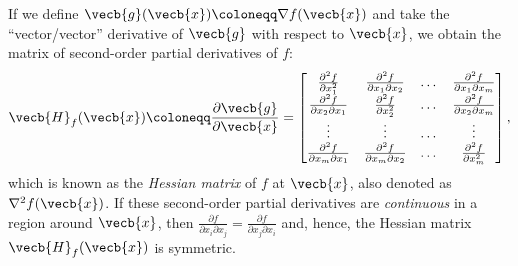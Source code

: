 If we define $\vecb{g}(\vecb{x}) \coloneqq \nabla f(\vecb{x})$ and take the ``vector/vector'' derivative of $\vecb{g}$ with respect to $\vecb{x}$, we obtain the matrix of second-order partial derivatives of $f$:
\begin{equation}
	\vecb{H}_f(\vecb{x}) \coloneqq \frac{\partial \vecb{g}}{\partial \vecb{x}} =
	\begin{bmatrix}
		\frac{\partial^2 f}{\partial x_1^2}            & \frac{\partial^2 f}{\partial x_1 \partial x_2} & \dots & \frac{\partial^2 f}{\partial x_1 \partial x_m} \\
		\frac{\partial^2 f}{\partial x_2 \partial x_1} & \frac{\partial^2 f}{\partial x_2^2}            & \dots & \frac{\partial^2 f}{\partial x_2 \partial x_m} \\
		\vdots                                         & \vdots                                         & \dots & \vdots                                         \\
		\frac{\partial^2 f}{\partial x_m \partial x_1} & \frac{\partial^2 f}{\partial x_m \partial x_2} & \dots & \frac{\partial^2 f}{\partial x_m^2}
	\end{bmatrix}, \label{eq:HessianMatrix}
\end{equation}
which is known as the \textit{Hessian matrix} of $f$ at $\vecb{x}$, also denoted as $\nabla^2 f(\vecb{x})$. If these second-order partial derivatives are \textit{continuous} in a region around $\vecb{x}$, then $\frac{\partial f}{\partial x_i \partial x_j} = \frac{\partial f}{\partial x_j \partial x_i}$ and, hence, the Hessian matrix $\vecb{H}_f(\vecb{x})$ is symmetric.

